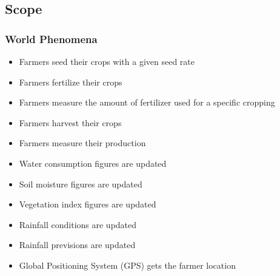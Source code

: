 \subsection{Scope}

\subsubsection{World Phenomena}
\begin{itemize}
	\item
	Farmers seed their crops with a given seed rate
	\item
	Farmers fertilize their crops
	\item
	Farmers measure the amount of fertilizer used for a specific cropping
	\item
	Farmers harvest their crops
	\item
	Farmers measure their production
	\item
	Water consumption figures are updated 
	\item
	Soil moisture figures are updated
	\item
	Vegetation index figures are updated
	\item
	Rainfall conditions are updated
	\item
	Rainfall previsions are updated
	\item
	Global Positioning System (GPS) gets the farmer location
\end{itemize}


